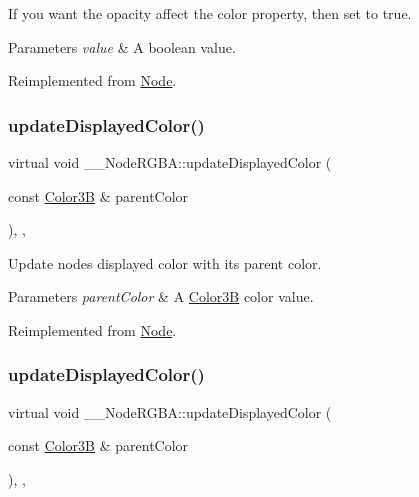 If you want the opacity affect the color property, then set to true. 
\begin{DoxyParams}{Parameters}
{\em value} & A boolean value. \\
\hline
\end{DoxyParams}


Reimplemented from \hyperlink{classNode_a978c5435ab23f76e9efdf0f7e9e288e5}{Node}.

\mbox{\label{class____NodeRGBA_a7b792b469020beebcd515a2eacba90f7}} 
\subsubsection{\texorpdfstring{update\+Displayed\+Color()}{updateDisplayedColor()}\hspace{0.1cm}{\footnotesize\ttfamily [1/2]}}
{\footnotesize\ttfamily virtual void \+\_\+\+\_\+\+Node\+R\+G\+B\+A\+::update\+Displayed\+Color (\begin{DoxyParamCaption}\item[{const \hyperlink{structColor3B}{Color3B} \&}]{parent\+Color }\end{DoxyParamCaption})\hspace{0.3cm}{\ttfamily [inline]}, {\ttfamily [override]}, {\ttfamily [virtual]}}

Update node\textquotesingle{}s displayed color with its parent color. 
\begin{DoxyParams}{Parameters}
{\em parent\+Color} & A \hyperlink{structColor3B}{Color3B} color value. \\
\hline
\end{DoxyParams}


Reimplemented from \hyperlink{classNode_ac733bae7b9590f8da746cbc3d1337a2f}{Node}.

\mbox{\label{class____NodeRGBA_a7b792b469020beebcd515a2eacba90f7}} 
\subsubsection{\texorpdfstring{update\+Displayed\+Color()}{updateDisplayedColor()}\hspace{0.1cm}{\footnotesize\ttfamily [2/2]}}
{\footnotesize\ttfamily virtual void \+\_\+\+\_\+\+Node\+R\+G\+B\+A\+::update\+Displayed\+Color (\begin{DoxyParamCaption}\item[{const \hyperlink{structColor3B}{Color3B} \&}]{parent\+Color }\end{DoxyParamCaption})\hspace{0.3cm}{\ttfamily [inline]}, {\ttfamily [override]}, {\ttfamily [virtual]}}


